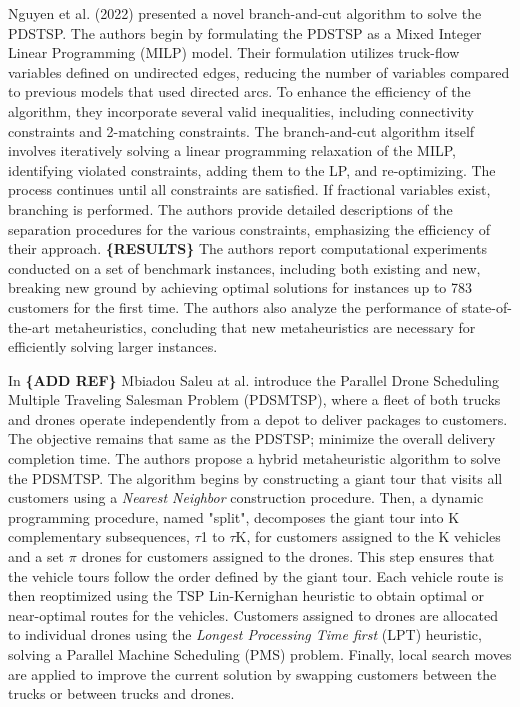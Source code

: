 \documentclass{article}
\begin{document}
	 \par
	 Nguyen et al. (2022) presented a novel branch-and-cut algorithm to solve the PDSTSP. The authors begin by formulating the PDSTSP as a Mixed Integer Linear Programming (MILP) model. Their formulation utilizes truck-flow variables defined on undirected edges, reducing the number of variables compared to previous models that used directed arcs. To enhance the efficiency of the algorithm, they incorporate several valid inequalities, including connectivity constraints and 2-matching constraints.
	 The branch-and-cut algorithm itself involves iteratively solving a linear programming relaxation of the MILP, identifying violated constraints, adding them to the LP, and re-optimizing. The process continues until all constraints are satisfied. If fractional variables exist, branching is performed. The authors provide detailed descriptions of the separation procedures for the various constraints, emphasizing the efficiency of their approach.
	 \textbf{\{RESULTS\}} The authors report computational experiments conducted on a set of benchmark instances, including both existing and new, breaking new ground by achieving optimal solutions for instances up to 783 customers for the first time. The authors also analyze the performance of state-of-the-art metaheuristics, concluding that new metaheuristics are necessary for efficiently solving larger instances.
	\par 
	In \textbf{\{ADD REF\}} Mbiadou Saleu at al. introduce the Parallel Drone Scheduling Multiple Traveling Salesman Problem (PDSMTSP), where a fleet of both trucks and drones operate independently from a depot to deliver packages to customers. The objective remains that same as the PDSTSP; minimize the overall delivery completion time. The authors propose a hybrid metaheuristic algorithm to solve the PDSMTSP. The algorithm begins by constructing a giant tour that visits all customers using a \textit{Nearest Neighbor} construction procedure. Then, a dynamic programming procedure, named "split", decomposes the giant tour into K complementary subsequences, $\tau$1 to $\tau$K, for customers assigned to the K vehicles and a set $\pi$ drones for customers assigned to the drones. This step ensures that the vehicle tours follow the order defined by the giant tour. Each vehicle route is then reoptimized using the TSP Lin-Kernighan heuristic to obtain optimal or near-optimal routes for the vehicles. Customers assigned to drones are allocated to individual drones using the \textit{Longest Processing Time first} (LPT) heuristic, solving a Parallel Machine Scheduling (PMS) problem. Finally, local search moves are applied to improve the current solution by swapping customers between the trucks or between trucks and drones. 
\end{document}
